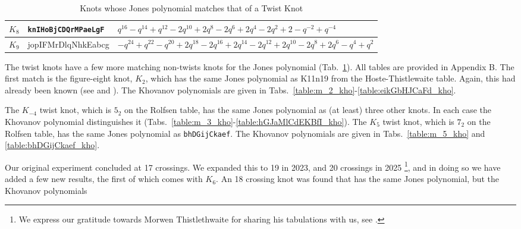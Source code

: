 \documentclass{article}
\theoremstyle{plain}
\begin{document}
\begin{table}[H]
{\begin{tabular}{| l | l | l |}
                    \hline
                        $K_{8}$&
                        \texttt{knIHoBjCDQrMPaeLgF}&
                        $q^{16}-q^{14}+q^{12}-2q^{10}+2q^{8}-2q^{6}+2q^{4}-2q^{2}+2-q^{-2}+q^{-4}$\\
                    \hline
                        $K_{9}$&
                        jopIFMrDlqNhkEabcg&
                        $-q^{24}+q^{22}-q^{20}+2q^{18}-2q^{16}+2q^{14}-2q^{12}+2q^{10}-2q^{8}+2q^{6}-q^{4}+q^{2}$\\
                    \hline
                \end{tabular}%
            }
            \caption{Knots whose Jones polynomial matches that of a Twist Knot}
            \label{table:matching_twist_knots}
        \end{table}
        The twist knots have a few more matching non-twists knots for the
        Jones polynomial (Tab.~\ref{table:matching_twist_knots}).
        All tables are provided in Appendix B.
        The first match is the
        figure-eight knot, $K_{2}$, which has the same Jones polynomial as
        K11n19 from the Hoste-Thistlewaite table.
        Again, this had already been known
        (see \cite{KatlasFigureEight} and \cite{KatlasK11n19}).
        The Khovanov polynomials are
        given in Tabs.~\ref{table:m_2_kho}-\ref{table:eikGbHJCaFd_kho}.
        \par\hfill\par
        The $K_{-4}$ twist knot, which is $5_{2}$ on the Rolfsen table,
        has the same Jones polynomial as (at least) three other knots. In each
        case the Khovanov polynomial distinguishes it
        (Tabs.~\ref{table:m_3_kho}-\ref{table:hGJaMlCdEKBfI_kho}).
        The $K_{5}$ twist knot, which is $7_{2}$ on the Rolfsen table, has the
        same Jones polynomial as \texttt{bhDGijCkaef}. The Khovanov polynomials
        are given in Tabs.~\ref{table:m_5_kho} and \ref{table:bhDGijCkaef_kho}.
        \par\hfill\par
        Our original experiment concluded at 17 crossings. We expanded
        this to 19 in 2023, and 20 crossings in 2025%
        \footnote{
            We express our gratitude towards Morwen Thistlethwaite for
            sharing his tabulations with us, see
            \cite{Thistlethwaite20CrossingKnots}.
        },
        and in doing so we have added a few new results,
        the first of which comes with
        $K_{6}$. An 18 crossing knot was found
        that has the same Jones polynomial, but the Khovanov polynomials
\end{document}
